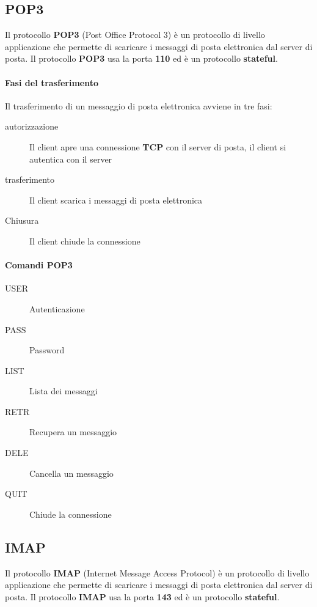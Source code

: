     \subsection{POP3}
        Il protocollo \textbf{POP3} (Post Office Protocol 3) è un protocollo di livello applicazione che permette di scaricare i messaggi di posta elettronica dal server di posta. Il protocollo \textbf{POP3} usa la porta \textbf{110} ed è un protocollo \textbf{stateful}.
        \paragraph{Fasi del trasferimento} Il trasferimento di un messaggio di posta elettronica avviene in tre fasi:
            \begin{description}
                \item[autorizzazione] Il client apre una connessione \textbf{TCP} con il server di posta, il client si autentica con il server
                \item[trasferimento] Il client scarica i messaggi di posta elettronica
                \item[Chiusura] Il client chiude la connessione
            \end{description}
        \paragraph{Comandi POP3}
            \begin{description}
                \item[USER] Autenticazione
                \item[PASS] Password
                \item[LIST] Lista dei messaggi
                \item[RETR] Recupera un messaggio
                \item[DELE] Cancella un messaggio
                \item[QUIT] Chiude la connessione
            \end{description}
    \subsection{IMAP}
        Il protocollo \textbf{IMAP} (Internet Message Access Protocol) è un protocollo di livello applicazione che permette di scaricare i messaggi di posta elettronica dal server di posta. Il protocollo \textbf{IMAP} usa la porta \textbf{143} ed è un protocollo \textbf{stateful}.
